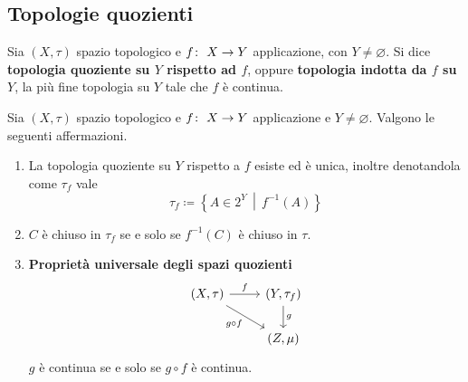 \subsection{\textcolor{TopGener}{\textbf{Topologie quozienti}}}



\begin{definition}
	Sia $(X, \tau)$ spazio topologico e $f \colon\ X \rightarrow Y$ applicazione, con $Y \neq \varnothing$. Si dice\textbf{ topologia quoziente su $Y$ rispetto ad $f$}, oppure \textbf{topologia indotta da $f$ su $Y$}, la più fine topologia su $Y$ tale che $f$ è continua. 
\end{definition}

\begin{theorem}
	Sia $(X, \tau)$ spazio topologico e $f \colon\ X \rightarrow Y$ applicazione e $Y \neq \varnothing$. Valgono le seguenti affermazioni.
	
	
	
	
	\begin{enumerate}
		\item La topologia quoziente su $Y$ rispetto a $f$ esiste ed è unica, inoltre denotandola come $\tau_f$ vale 
		\begin{equation*}
			\tau_f \coloneqq \left\{ A \in 2^Y \,\middle|\, f^{-1}(A) \right\}
		\end{equation*}
		\item $C$ è chiuso in $\tau_f$ se e solo se $f^{-1}(C)$ è chiuso in $\tau$.
		\item \textbf{Proprietà universale degli  spazi quozienti} 
		\begin{equation*}
		\begin{tikzcd}
		(X, \tau) \arrow[swap]{rd}{g\circ f} \arrow{r}{f} & (Y, \tau_f) \arrow{d}{g} \\
		& (Z, \mu) 
		\end{tikzcd}
		\end{equation*}
		$g$ è continua se e solo se $g \circ f$ è continua. 
	\end{enumerate}
\end{theorem}
